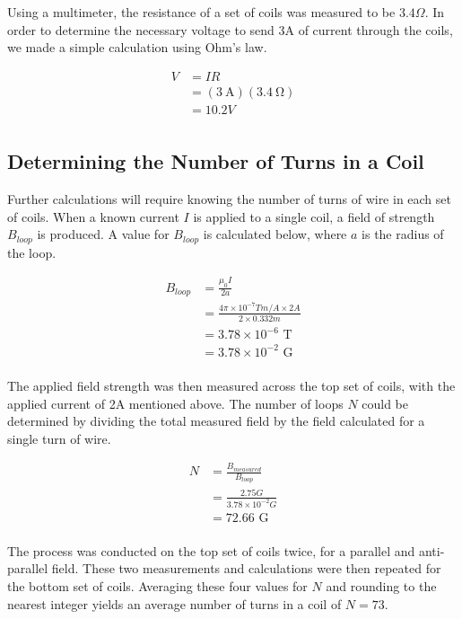 \documentclass[a4paper]{article}
\begin{document}
\qq Using a multimeter, the resistance of a set of coils was measured to be
$3.4 \Omega$. In order to determine the necessary voltage to send 3A of current
through the coils, we made a simple calculation using Ohm's law.


\begin{align*}
V &= IR \\
  &= (\SI{3}{\ampere})(\SI{3.4}{\ohm}) \\
  &= 10.2V \\
\end{align*}

\subsection{Determining the Number of Turns in a Coil}

\qq Further calculations will require knowing the number of turns of wire in
each set of coils. When a known current $I$ is applied to a single coil, a field
of strength $B_{loop}$ is produced. A value for $B_{loop}$ is calculated below,
where $a$ is the radius of the loop.

\begin{align*}
B_{loop} &= \frac{\mu_0 I}{2a} \\
         &= \frac{4 \pi \times 10^{-7} Tm/A \times 2A}{2\times 0.332m} \\
         &= 3.78 \times 10^{-6} \text{ T} \\
         &= 3.78 \times 10^{-2} \text{ G} \\
\end{align*}

\qq The applied field strength was then measured across the top set of coils, with
the applied current of 2A mentioned above. The number of loops $N$ could be
determined by dividing the total measured field by the field calculated for a
single turn of wire.

\begin{align*}
N &= \frac{B_{measured}}{B_{loop}} \\
  &= \frac{2.75G}{3.78 \times 10^{-2}G} \\
  &= 72.66 \text{ G} \\
\end{align*}

\qq The process was conducted on the top set of coils twice, for a parallel and
anti-parallel field. These two measurements and calculations were then repeated
for the bottom set of coils. Averaging these four values for $N$ and rounding to
the nearest integer yields an average number of turns in a coil of $N=73$.
\end{document}
